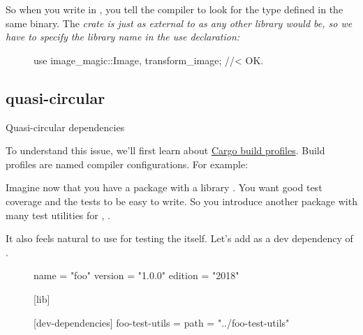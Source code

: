 \documentclass{article}
\begin{document}
So when you write  in , you tell the compiler to look for the type defined in the same binary.
The  \em{crate} is just as external to  as any other library would be, so we have to specify the library name in the use declaration:

\begin{figure}
\begin{code}[good]
use image_magic::{Image, transform_image}; //< OK.
\end{code}
\end{figure}

\subsection{quasi-circular}{Quasi-circular dependencies}

To understand this issue, we'll first learn about \href{https://doc.rust-lang.org/cargo/reference/profiles.html}{Cargo build profiles}.
Build profiles are named compiler configurations.
For example:

\begin{description}
\end{description}

Imagine now that you have a package with a library .
You want good test coverage and the tests to be easy to write.
So you introduce another package with many test utilities for , .

It also feels natural to use  for testing the  itself.
Let's add  as a dev dependency of .

\begin{figure}
\begin{code}[good]
[package]
name = "foo"
version = "1.0.0"
edition = "2018"

[lib]

[dev-dependencies]
foo-test-utils = { path = "../foo-test-utils" }
\end{code}
\end{figure}
\end{document}
